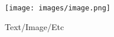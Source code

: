 \begin{figure}[H]
    \centering
    \begin{minipage}{0.5\linewidth}
        \texttt{[image: images/image.png]}
    \end{minipage}%
    \begin{minipage}{0.5\linewidth}
		Text/Image/Etc
    \end{minipage}
\end{figure}